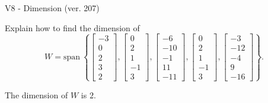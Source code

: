 \begin{exercise}
  \begin{exerciseTitle}V8 - Dimension (ver. 207)\end{exerciseTitle}
  \begin{exerciseStatement}
    Explain how to find the dimension of 
\[W=\mathrm{span}\ \left\{\left[\begin{array}{r}
-3 \\
0 \\
2 \\
3 \\
2
\end{array}\right] , \left[\begin{array}{r}
0 \\
2 \\
1 \\
-1 \\
3
\end{array}\right] , \left[\begin{array}{r}
-6 \\
-10 \\
-1 \\
11 \\
-11
\end{array}\right] , \left[\begin{array}{r}
0 \\
2 \\
1 \\
-1 \\
3
\end{array}\right] , \left[\begin{array}{r}
-3 \\
-12 \\
-4 \\
9 \\
-16
\end{array}\right]\right\}.\]



  \end{exerciseStatement}
  \begin{exerciseAnswer}
   The dimension of \(W\) is  \(2\).
  


  \end{exerciseAnswer}
\end{exercise}